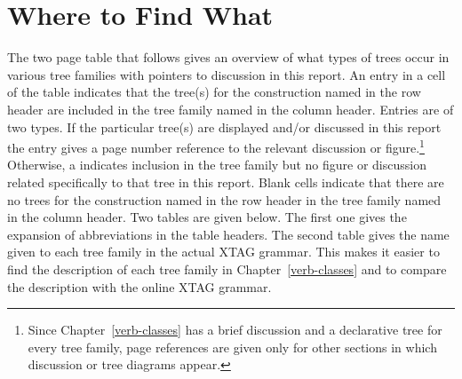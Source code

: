 \chapter{Where to Find What} 
\label{table-intro} 
 
The two page table that follows gives an overview of what types of 
trees occur in various tree families with pointers to discussion in 
this report.  An entry in a cell of the table indicates that the 
tree(s) for the construction named in the row header are included in 
the tree family named in the column header. Entries are of two types. 
If the particular tree(s) are displayed and/or discussed in this 
report the entry gives a page number reference to the relevant 
discussion or figure.\footnote{Since Chapter~\ref{verb-classes} has a   brief discussion and a declarative tree for every tree family, page   references are given only for other sections in which discussion or   tree diagrams appear.}  Otherwise, a \xtagcheck \space indicates 
inclusion in the tree family but no figure or discussion related 
specifically to that tree in this report.  Blank cells indicate that 
there are no trees for the construction named in the row header in the 
tree family named in the column header.  Two tables are given below. 
The first one gives the expansion of abbreviations in the table 
headers. The second table gives the name given to each tree family in 
the actual XTAG grammar. This makes it easier to find the description 
of each tree family in Chapter~\ref{verb-classes} and to compare the 
description with the online XTAG grammar. 
 
\vspace{0.3in} 
 
